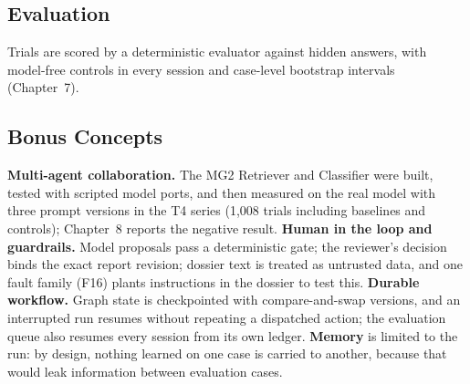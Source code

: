 \subsection{Evaluation}
Trials are scored by a deterministic evaluator against hidden answers, with model-free controls in
every session and case-level bootstrap intervals (Chapter~7).

\subsection{Bonus Concepts}
\textbf{Multi-agent collaboration.} The MG2 Retriever and Classifier were built, tested with
scripted model ports, and then measured on the real model with three prompt versions in the T4 series
(1{,}008 trials including baselines and controls); Chapter~8 reports the negative result.
\textbf{Human in the loop and guardrails.} Model proposals pass a deterministic gate; the reviewer's
decision binds the exact report revision; dossier text is treated as untrusted data, and one
fault family (F16) plants instructions in the dossier to test this.
\textbf{Durable workflow.} Graph state is checkpointed with compare-and-swap versions, and an
interrupted run resumes without repeating a dispatched action; the evaluation queue also resumes
every session from its own ledger.
\textbf{Memory} is limited to the run: by design, nothing learned on one case is carried to another,
because that would leak information between evaluation cases.
